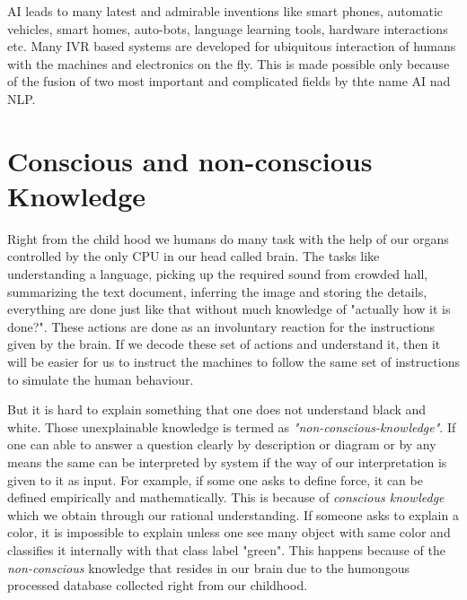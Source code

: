 \documentclass{bmcart}
\begin{document}
AI leads to many latest and admirable inventions like smart phones, automatic vehicles, smart homes, auto-bots, language learning tools, hardware interactions etc. Many IVR based systems are developed for ubiquitous interaction of humans with the machines and electronics on the fly. This is made possible only because of the fusion of two most important and complicated fields by thte name AI nad NLP.

\section{Conscious and non-conscious Knowledge}
\label{sec:knowledge} 

Right from the child hood we humans do many task with the help of our organs controlled by the only CPU in our head called brain. The tasks like understanding a language, picking up the required sound from crowded hall, summarizing the text document, inferring the image and storing the details, everything are done just like that without much knowledge of "actually how it is done?". These actions are done as an involuntary reaction for the instructions given by the brain. If we decode these set of actions and understand it, then it will be easier for us to instruct the machines to follow the same set of instructions to simulate the human behaviour.

But it is hard to explain something that one does not understand black and white. Those unexplainable knowledge is termed as \textit{"non-conscious-knowledge"}. If one can able to answer a question clearly by description or diagram or by any means the same can be interpreted by system if the way of our interpretation is given to it as input. For example, if some one asks to define force, it can be defined empirically and mathematically. This is because of \textit{conscious knowledge} which we obtain through our rational understanding. If someone asks to explain a color, it is impossible to explain unless one see many object with same color and classifies it internally with that class label "green". This happens because of the \textit{non-conscious} knowledge that resides in our brain due to the humongous processed database collected right from our childhood.

\newpage
\end{document}
